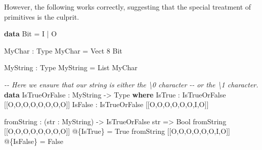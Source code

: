 \documentclass[
]{article}
\newenvironment{Shaded}{}{}
\newcommand{\CommentTok}[1]{\textcolor[rgb]{0.38,0.63,0.69}{\textit{#1}}}
\newcommand{\DataTypeTok}[1]{\textcolor[rgb]{0.56,0.13,0.00}{#1}}
\newcommand{\DecValTok}[1]{\textcolor[rgb]{0.25,0.63,0.44}{#1}}
\newcommand{\KeywordTok}[1]{\textcolor[rgb]{0.00,0.44,0.13}{\textbf{#1}}}
\newcommand{\NormalTok}[1]{#1}
\newcommand{\OperatorTok}[1]{\textcolor[rgb]{0.40,0.40,0.40}{#1}}
\newcommand{\OtherTok}[1]{\textcolor[rgb]{0.00,0.44,0.13}{#1}}
\begin{document}
However, the following works correctly, suggesting that the special
treatment of primitives is the culprit.

\begin{Shaded}
\begin{Highlighting}[]
\KeywordTok{data} \DataTypeTok{Bit} \OtherTok{=} \DataTypeTok{I} \OperatorTok{|} \DataTypeTok{O}

\DataTypeTok{MyChar} \OperatorTok{:} \DataTypeTok{Type}
\DataTypeTok{MyChar} \OtherTok{=} \DataTypeTok{Vect} \DecValTok{8} \DataTypeTok{Bit}

\DataTypeTok{MyString} \OperatorTok{:} \DataTypeTok{Type}
\DataTypeTok{MyString} \OtherTok{=} \DataTypeTok{List} \DataTypeTok{MyChar}

\CommentTok{{-}{-} Here we ensure that our string is either the \textbackslash{}0 character}
\CommentTok{{-}{-} or the \textbackslash{}1 character.}
\KeywordTok{data} \DataTypeTok{IsTrueOrFalse} \OperatorTok{:} \DataTypeTok{MyString} \OtherTok{{-}\textgreater{}} \DataTypeTok{Type} \KeywordTok{where}
  \DataTypeTok{IsTrue} \OperatorTok{:} \DataTypeTok{IsTrueOrFalse}\NormalTok{ [[}\DataTypeTok{O}\NormalTok{,}\DataTypeTok{O}\NormalTok{,}\DataTypeTok{O}\NormalTok{,}\DataTypeTok{O}\NormalTok{,}\DataTypeTok{O}\NormalTok{,}\DataTypeTok{O}\NormalTok{,}\DataTypeTok{O}\NormalTok{,}\DataTypeTok{O}\NormalTok{]]}
  \DataTypeTok{IsFalse} \OperatorTok{:} \DataTypeTok{IsTrueOrFalse}\NormalTok{ [[}\DataTypeTok{O}\NormalTok{,}\DataTypeTok{O}\NormalTok{,}\DataTypeTok{O}\NormalTok{,}\DataTypeTok{O}\NormalTok{,}\DataTypeTok{O}\NormalTok{,}\DataTypeTok{O}\NormalTok{,}\DataTypeTok{I}\NormalTok{,}\DataTypeTok{O}\NormalTok{]]}

\NormalTok{fromString }\OperatorTok{:}\NormalTok{ (str }\OperatorTok{:} \DataTypeTok{MyString}\NormalTok{) }\OtherTok{{-}\textgreater{}} \DataTypeTok{IsTrueOrFalse}\NormalTok{ str }\OtherTok{=\textgreater{}} \DataTypeTok{Bool}
\NormalTok{fromString [[}\DataTypeTok{O}\NormalTok{,}\DataTypeTok{O}\NormalTok{,}\DataTypeTok{O}\NormalTok{,}\DataTypeTok{O}\NormalTok{,}\DataTypeTok{O}\NormalTok{,}\DataTypeTok{O}\NormalTok{,}\DataTypeTok{O}\NormalTok{,}\DataTypeTok{O}\NormalTok{]] }\OperatorTok{@}\NormalTok{\{}\DataTypeTok{IsTrue}\NormalTok{\} }\OtherTok{=} \DataTypeTok{True}
\NormalTok{fromString [[}\DataTypeTok{O}\NormalTok{,}\DataTypeTok{O}\NormalTok{,}\DataTypeTok{O}\NormalTok{,}\DataTypeTok{O}\NormalTok{,}\DataTypeTok{O}\NormalTok{,}\DataTypeTok{O}\NormalTok{,}\DataTypeTok{I}\NormalTok{,}\DataTypeTok{O}\NormalTok{]] }\OperatorTok{@}\NormalTok{\{}\DataTypeTok{IsFalse}\NormalTok{\} }\OtherTok{=} \DataTypeTok{False}
\end{Highlighting}
\end{Shaded}
\end{document}
